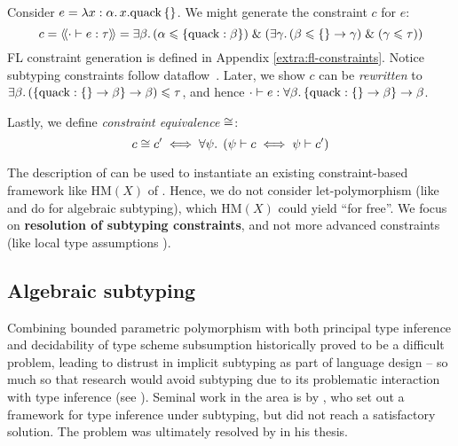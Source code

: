 \begin{example}
    Consider $e = \lambda {x: \alpha} \ldotp {x}{.}{\mathrm{quack}}\,\{\}$. We might generate the constraint $c$ for $e$:
    $$ c = \cstr{\cdot}{e}{\tau} = \exists \beta \ldotp (\alpha \sub \flrec{\mathrm{quack}: \beta}) \und \left( \exists \gamma \ldotp (\beta \sub \flrec{} \to \gamma) \und (\gamma \sub \tau) \right) $$
    FL constraint generation is defined in Appendix \ref{extra:fl-constraints}. Notice subtyping constraints follow dataflow~\cite{mlsub}.
    Later, we show $c$ can be \emph{rewritten} to $\exists \beta \ldotp (\flrec{\mathrm{quack} : \flrec{} \to \beta} \to \beta) \sub \tau$, and hence 
    $\cdot \vdash e : \forall \beta \ldotp \flrec{\mathrm{quack} : \flrec{} \to \beta} \to \beta$.
\end{example}

Lastly, we define \emph{constraint equivalence} $\cong$:
$$ c \cong c' \iff  \forall \psi \ldotp \; (\psi \vdash c \iff \psi \vdash c') $$

The description of \inference{} can be used to instantiate an existing constraint-based framework like $\mathrm{HM}(X)$ of \textcite{constraint-based-hm}. Hence, we do not consider let-polymorphism (like \textcite{dolan-thesis} and \textcite{simple-sub} do for algebraic subtyping), which $\mathrm{HM}(X)$ could yield \enquote{for free}. We focus on \textbf{resolution of subtyping constraints}, and not more advanced constraints (like local type assumptions \cite{outside-in}).


\subsection{Algebraic subtyping}
\label{subsec:algebraic-subtyping-background}

Combining bounded parametric polymorphism with both principal type inference and decidability of type scheme subsumption historically proved to be a difficult problem, leading to distrust in implicit subtyping as part of language design \cite{mlstruct} -- so much so that research would avoid subtyping due to its problematic interaction with type inference (see \eg{} \cite[Section~3.5]{linear-haskell}). Seminal work in the area is by \textcite{pottier-thesis}, who set out a framework for type inference under subtyping, but did not reach a satisfactory solution. The problem was ultimately resolved by \textcite{dolan-thesis} in his thesis.

